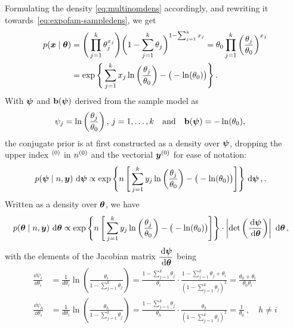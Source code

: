 Formulating the density \eqref{eq:multinomdens} accordingly, and rewriting it towards~\eqref{eq:expofam-sampledens},
we get
\begin{align*}
p(\x\mid\btheta)&= \Bigg( \prod_{j=1}^k \theta_j^{x_j}\Bigg) \bigg( 1 - \sum_{j=1}^k \theta_j\bigg)^{1-\sum_{j=1}^k x_j}%
                 = \theta_0 \prod_{j=1}^k \left(\frac{\theta_j}{\theta_0}\right)^{x_j} \\
                &= \exp\Bigg\{ \sum_{j=1}^k x_j \ln\bigg(\frac{\theta_j}{\theta_0}\bigg) - \big(-\ln(\theta_0)\big) \Bigg\}\,.
\end{align*}
With $\boldsymbol{\psi}$ and $\mathbf{b}(\boldsymbol{\psi})$ derived from the sample model as
\begin{align*}
\psi_j &= \ln\left(\frac{\theta_j}{\theta_0}\right),\, j=1,\ldots,k & \text{and}& &
\mbf{b}(\bpsi) &= -\ln(\theta_0),\,%
\end{align*}
the conjugate prior is at first constructed as a density over $\boldsymbol{\psi}$,
dropping the upper index ${}^{(0)}$ in $n^{(0)}$ and the vectorial ${\bm y}^{(0)}$ for ease of notation:
\begin{align*}
p(\boldsymbol{\psi}\mid n,{\bm y})\, \,\mathrm{d}\boldsymbol{\psi}
 &\propto \exp\Bigg\{n\, \Bigg[ \sum_{j=1}^k y_j \ln\bigg(\frac{\theta_j}{\theta_0}\bigg) - \big(-\ln(\theta_0)\big) \Bigg] \Bigg\} \,\,\mathrm{d}\boldsymbol{\psi}\,,.
\end{align*}
Written as a density over $\boldsymbol{\theta}$, we have
\begin{align*}
p(\boldsymbol{\theta}\mid n,{\bm y})\, \,\mathrm{d}\boldsymbol{\theta}
 &\propto \exp\Bigg\{n\, \Bigg[ \sum_{j=1}^k y_j \ln\bigg(\frac{\theta_j}{\theta_0}\bigg) - \big(-\ln(\theta_0)\big) \Bigg] \Bigg\}
  \cdot \left| \det\left(\frac{\,\mathrm{d}\boldsymbol{\psi}}{\,\mathrm{d}\boldsymbol{\theta}}\right) \right|\, \,\mathrm{d}\boldsymbol{\theta}\,,
\end{align*}
with the elements of the Jacobian matrix $\dfrac{\,\mathrm{d}\boldsymbol{\psi}}{\,\mathrm{d}\boldsymbol{\theta}}$ being
\begin{align*}
\frac{\dd\psi_i}{\dd\theta_i} &= \frac{1}{d\theta_i} \ln\left(\frac{\theta_i}{1 - \sum_{j=1}^k \theta_j}\right)
                               = \frac{1-\sum_{j=1}^k \theta_j}{\theta_i}
                                 \cdot \frac{1 - \sum_{j=1}^k \theta_j + \theta_i}{(1 - \sum_{j=1}^k \theta_j)^2}
                               = \frac{\theta_0 + \theta_i}{\theta_0 \theta_i}\\
\frac{\dd\psi_h}{\dd\theta_i} &= \frac{1}{d\theta_i} \ln\left(\frac{\theta_h}{1 - \sum_{j=1}^k \theta_j}\right)
                               = \frac{1-\sum_{j=1}^k \theta_j}{\theta_h} \cdot \frac{\theta_h}{(1 - \sum_{j=1}^k \theta_j)^2}
                               = \frac{1}{\theta_0}\,, \quad h \neq i
\end{align*}
